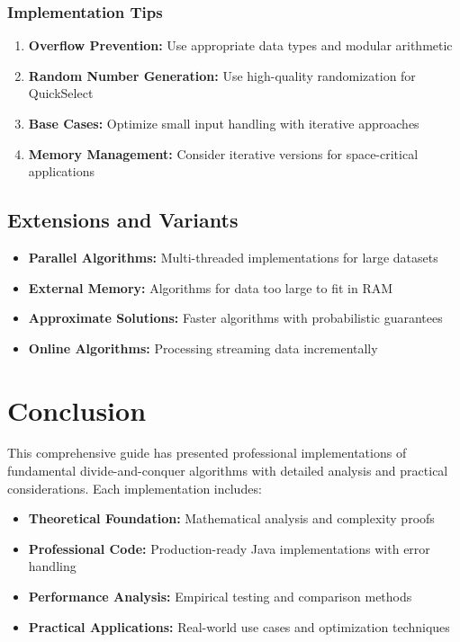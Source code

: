 \documentclass[12pt,a4paper]{article}
\begin{document}
\subsubsection{Implementation Tips}

\begin{enumerate}
    \item \textbf{Overflow Prevention:} Use appropriate data types and modular arithmetic
    \item \textbf{Random Number Generation:} Use high-quality randomization for QuickSelect
    \item \textbf{Base Cases:} Optimize small input handling with iterative approaches
    \item \textbf{Memory Management:} Consider iterative versions for space-critical applications
\end{enumerate}

\subsection{Extensions and Variants}

\begin{itemize}
    \item \textbf{Parallel Algorithms:} Multi-threaded implementations for large datasets
    \item \textbf{External Memory:} Algorithms for data too large to fit in RAM
    \item \textbf{Approximate Solutions:} Faster algorithms with probabilistic guarantees
    \item \textbf{Online Algorithms:} Processing streaming data incrementally
\end{itemize}

\newpage

\section{Conclusion}

This comprehensive guide has presented professional implementations of fundamental divide-and-conquer algorithms with detailed analysis and practical considerations. Each implementation includes:

\begin{itemize}
    \item \textbf{Theoretical Foundation:} Mathematical analysis and complexity proofs
    \item \textbf{Professional Code:} Production-ready Java implementations with error handling
    \item \textbf{Performance Analysis:} Empirical testing and comparison methods
    \item \textbf{Practical Applications:} Real-world use cases and optimization techniques
\end{itemize}
\end{document}
